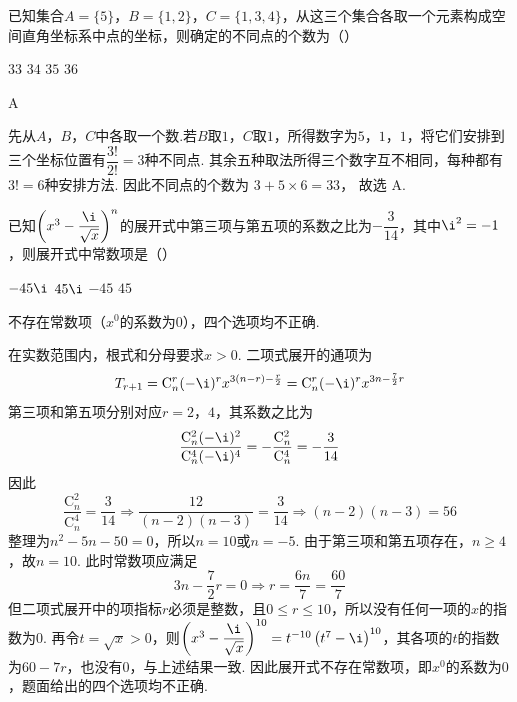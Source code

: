 \begin{problem}
已知集合\(A=\{5\}\)，\(B=\{1,2\}\)，\(C=\{1,3,4\}\)，从这三个集合各取一个元素构成空间直角坐标系中点的坐标，则确定的不同点的个数为（\quad）

\choices
    {\(33\)}
    {\(34\)}
    {\(35\)}
    {\(36\)}
\end{problem}

\begin{answer}
A
\end{answer}

\begin{solution}
先从\(A\)，\(B\)，\(C\)中各取一个数.若\(B\)取\(1\)，\(C\)取\(1\)，所得数字为\(5\)，\(1\)，\(1\)，将它们安排到三个坐标位置有\(\dfrac{3!}{2!}=3\)种不同点. 其余五种取法所得三个数字互不相同，每种都有\(3!=6\)种安排方法. 因此不同点的个数为
\(3+5\times6=33\)，
故选 A.
\end{solution}

\begin{problem}
已知\(\left(x^{3}-\dfrac{\i}{\sqrt{x}}\right)^n\)的展开式中第三项与第五项的系数之比为\(-\dfrac{3}{14}\)，其中\(\i^2=-1\)，则展开式中常数项是（\quad）

\choices
    {\(-45\i\)}
    {\(45\i\)}
    {\(-45\)}
    {\(45\)}
\end{problem}

\begin{answer}
不存在常数项（\(x^0\)的系数为\(0\)），四个选项均不正确.
\end{answer}

\begin{solution}
在实数范围内，根式和分母要求\(x>0\). 二项式展开的通项为
\[
T_{r+1}=\mathrm C_n^r(-\i)^r x^{3(n-r)-\frac r2}
       =\mathrm C_n^r(-\i)^r x^{3n-\frac72r}
\]
第三项和第五项分别对应\(r=2\)，\(4\)，其系数之比为
\[
\frac{\mathrm C_n^2(-\i)^2}{\mathrm C_n^4(-\i)^4}
=-\frac{\mathrm C_n^2}{\mathrm C_n^4}
=-\frac{3}{14}
\]
因此
\[
\frac{\mathrm C_n^2}{\mathrm C_n^4}=\frac{3}{14}
\Longrightarrow
\frac{12}{(n-2)(n-3)}=\frac{3}{14}
\Longrightarrow (n-2)(n-3)=56
\]
整理为\(n^2-5n-50=0\)，所以\(n=10\)或\(n=-5\). 由于第三项和第五项存在，\(n\geqslant4\)，故\(n=10\).
此时常数项应满足
\[
3n-\frac72r=0
\Longrightarrow r=\frac{6n}{7}=\frac{60}{7}
\]
但二项式展开中的项指标\(r\)必须是整数，且\(0\leqslant r\leqslant10\)，所以没有任何一项的\(x\)的指数为\(0\). 再令\(t=\sqrt{x}>0\)，则\(\left(x^3-\dfrac{\i}{\sqrt{x}}\right)^{10}=t^{-10}\left(t^7-\i\right)^{10}\)，其各项的\(t\)的指数为\(60-7r\)，也没有\(0\)，与上述结果一致. 因此展开式不存在常数项，即\(x^0\)的系数为\(0\)，题面给出的四个选项均不正确.
\end{solution}

